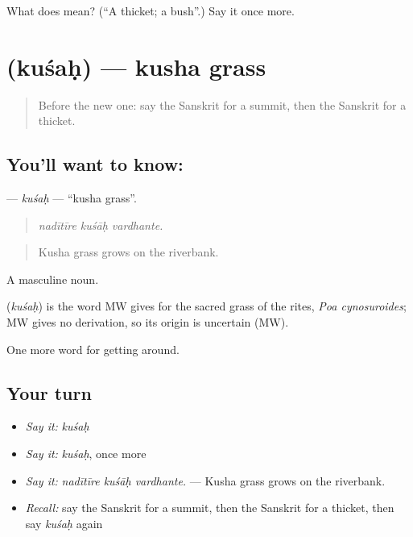 \begin{tcolorbox}[breakable,colback=teal!4,colframe=teal!35!black,title={Before you move on}]
What does  mean? (\textquotedblleft{}A thicket; a bush\textquotedblright{}.) Say it once more.
\end{tcolorbox}
\section[\texorpdfstring{\sk{कुशः} (kuśaḥ)}{कुशः (kuśaḥ)}]{ (kuśaḥ) — kusha grass}

\label{lesson:SA-C446-kusah}



\begin{quote}
Before the new one: say the Sanskrit for a summit, then the Sanskrit for a thicket.
\end{quote}

\subsection*{You'll want to know: }
\textbf{} — \emph{kuśaḥ} — \textquotedblleft{}kusha grass\textquotedblright{}.

\begin{quote}
  
\end{quote}

\begin{quote}
\emph{nadītīre kuśāḥ vardhante.}
\end{quote}

\begin{quote}
Kusha grass grows on the riverbank.
\end{quote}

A masculine noun.

\begin{cousinweb}
\textbf{} (\emph{kuśaḥ}) is the word MW gives for the sacred grass of the rites, \emph{Poa cynosuroides}; MW gives no derivation, so its origin is uncertain (MW).
\end{cousinweb}

\begin{grammarlens}[title={What you've built}]
One more word for getting around.
\end{grammarlens}

\subsection*{Your turn}
\begin{itemize}
\raggedright
  \item \emph{Say it:} \emph{kuśaḥ}
  \item \emph{Say it:} \emph{kuśaḥ}, once more
  \item \emph{Say it:} \emph{nadītīre kuśāḥ vardhante.} — Kusha grass grows on the riverbank.
  \item \emph{Recall:} say the Sanskrit for a summit, then the Sanskrit for a thicket, then say \emph{kuśaḥ} again
\end{itemize}

